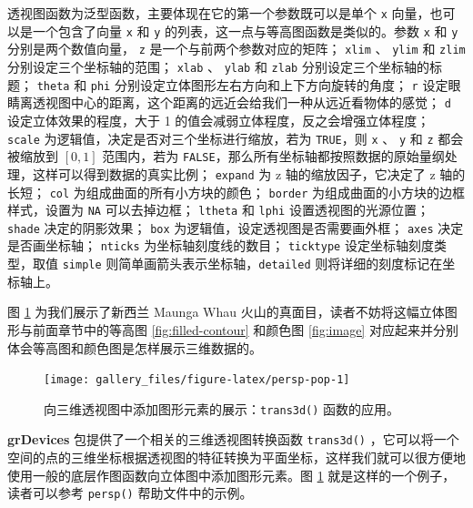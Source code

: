 \documentclass[
  b5paper,
  UTF8,twoside]{book}
\begin{document}
透视图函数为泛型函数，主要体现在它的第一个参数既可以是单个 \texttt{x} 向量，也可以是一个包含了向量 \texttt{x} 和 \texttt{y} 的列表，这一点与等高图函数是类似的。参数 \texttt{x} 和 \texttt{y} 分别是两个数值向量， \texttt{z} 是一个与前两个参数对应的矩阵； \texttt{xlim} 、 \texttt{ylim} 和 \texttt{zlim} 分别设定三个坐标轴的范围； \texttt{xlab} 、 \texttt{ylab} 和 \texttt{zlab} 分别设定三个坐标轴的标题； \texttt{theta} 和 \texttt{phi} 分别设定立体图形左右方向和上下方向旋转的角度； \texttt{r} 设定眼睛离透视图中心的距离，这个距离的远近会给我们一种从远近看物体的感觉； \texttt{d} 设定立体效果的程度，大于 1 的值会减弱立体程度，反之会增强立体程度； \texttt{scale} 为逻辑值，决定是否对三个坐标进行缩放，若为 \texttt{TRUE}，则 \texttt{x} 、 \texttt{y} 和 \texttt{z} 都会被缩放到 \([0, 1]\) 范围内，若为 \texttt{FALSE}，那么所有坐标轴都按照数据的原始量纲处理，这样可以得到数据的真实比例； \texttt{expand} 为 z 轴的缩放因子，它决定了 z 轴的长短； \texttt{col} 为组成曲面的所有小方块的颜色； \texttt{border} 为组成曲面的小方块的边框样式，设置为 \texttt{NA} 可以去掉边框； \texttt{ltheta} 和 \texttt{lphi} 设置透视图的光源位置； \texttt{shade} 决定的阴影效果； \texttt{box} 为逻辑值，设定透视图是否需要画外框； \texttt{axes} 决定是否画坐标轴； \texttt{nticks} 为坐标轴刻度线的数目； \texttt{ticktype} 设定坐标轴刻度类型，取值 \texttt{\textquotesingle{}simple\textquotesingle{}} 则简单画箭头表示坐标轴，\texttt{\textquotesingle{}detailed\textquotesingle{}} 则将详细的刻度标记在坐标轴上。

图 \ref{fig:persp-pop} 为我们展示了新西兰 Maunga Whau 火山的真面目，读者不妨将这幅立体图形与前面章节中的等高图 \ref{fig:filled-contour} 和颜色图 \ref{fig:image} 对应起来并分别体会等高图和颜色图是怎样展示三维数据的。





\begin{figure}

{\centering \texttt{[image: gallery\_files/figure-latex/persp-pop-1]} 

}

\caption[向三维透视图中添加图形元素的展示]{向三维透视图中添加图形元素的展示：\texttt{trans3d()} 函数的应用。}\label{fig:persp-pop}
\end{figure}

\textbf{grDevices} 包提供了一个相关的三维透视图转换函数 \texttt{trans3d()} ，它可以将一个空间的点的三维坐标根据透视图的特征转换为平面坐标，这样我们就可以很方便地使用一般的底层作图函数向立体图中添加图形元素。图 \ref{fig:persp-pop}
就是这样的一个例子，读者可以参考 \texttt{persp()} 帮助文件中的示例。
\end{document}
